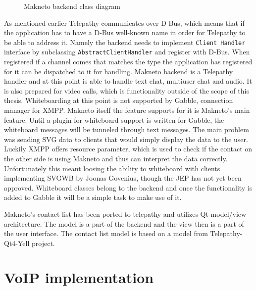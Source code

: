 \begin{figure}[ht]
	\begin{center}
	\caption{Makneto backend class diagram}
	\label{fig:MaknetoLibClassDiagram}
\end{center}
\end{figure}

As mentioned earlier Telepathy communicates over D-Bus, which means that if the application has to have a D-Bus well-known name in order for Telepathy to be able to address it.	Namely the backend needs to implement \verb|Client Handler| interface by subclassing \verb|AbstractClientHandler| and register with D-Bus. When registered if a channel comes that matches the type the application has registered for it can be dispatched to it for handling. Makneto backend is a Telepathy handler and at this point is able to handle text chat, multiuser chat and audio. It is also prepared for video calls, which is functionality outside of the scope of this thesis. Whiteboarding at this point is not supported by Gabble, connection manager for XMPP. Makneto itself the feature supports for it is Makneto's main feature. Until a plugin for whiteboard support is written for Gabble, the whiteboard messages will be tunneled through text messages. The main problem was sending SVG data to clients that would simply display the data to the user. Luckily XMPP offers resource parameter, which is used to check if the contact on the other side is using Makneto and thus can interpret the data correctly. Unfortunately this meant loosing the ability to whiteboard with clients implementing SVGWB by Joonas Govenius, though the JEP has not yet been approved. Whiteboard classes belong to the backend and once the functionality is added to Gabble it will be a simple task to make use of it. 

Makneto's contact list has been ported to telepathy and utilizes Qt model/view architecture. The model is a part of the backend and the view then is a part of the user interface. The contact list model is based on a model from Telepathy-Qt4-Yell project. 


\chapter{VoIP implementation}

